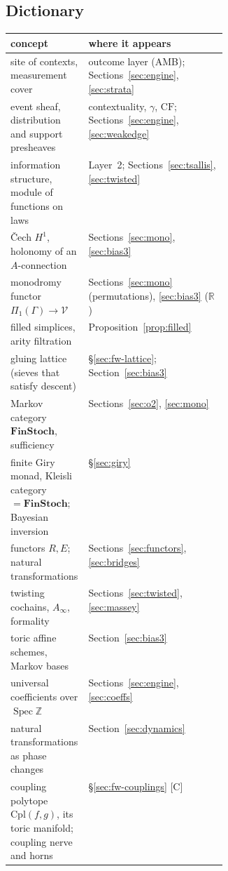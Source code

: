 \documentclass[11pt]{article}
\theoremstyle{definition}
\theoremstyle{remark}
\newcommand{\Z}{\mathbb{Z}}
\newcommand{\R}{\mathbb{R}}
\newcommand{\CF}{\mathrm{CF}}
\newcommand{\src}[1]{\textsf{\small[#1]}}
\begin{document}
\subsection{Dictionary}
\begin{center}\small
\begin{tabularx}{\linewidth}{@{}>{\raggedright}p{0.36\linewidth}>{\raggedright\arraybackslash}X@{}}
\toprule
concept & where it appears\\
\midrule
site of contexts, measurement cover & outcome layer (AMB); Sections~\ref{sec:engine}, \ref{sec:strata}\\
event sheaf, distribution and support presheaves & contextuality, $\gamma$, $\CF$; Sections~\ref{sec:engine}, \ref{sec:weakedge}\\
information structure, module of functions on laws & Layer~2; Sections~\ref{sec:tsallis}, \ref{sec:twisted}\\
\v{C}ech $H^1$, holonomy of an $A$-connection & Sections~\ref{sec:mono}, \ref{sec:bias3}\\
monodromy functor $\Pi_1(\Gamma)\to\mathcal V$ & Sections~\ref{sec:mono} (permutations), \ref{sec:bias3} ($\R$)\\
filled simplices, arity filtration & Proposition~\ref{prop:filled}\\
gluing lattice (sieves that satisfy descent) & \S\ref{sec:fw-lattice}; Section~\ref{sec:bias3}\\
Markov category $\mathbf{FinStoch}$, sufficiency & Sections~\ref{sec:o2}, \ref{sec:mono}\\
finite Giry monad, Kleisli category $=\mathbf{FinStoch}$; Bayesian inversion & \S\ref{sec:giry}\\
functors $R,E$; natural transformations & Sections~\ref{sec:functors}, \ref{sec:bridges}\\
twisting cochains, $A_\infty$, formality & Sections~\ref{sec:twisted}, \ref{sec:massey}\\
toric affine schemes, Markov bases & Section~\ref{sec:bias3}\\
universal coefficients over $\operatorname{Spec}\Z$ & Sections~\ref{sec:engine}, \ref{sec:coeffs}\\
natural transformations as phase changes & Section~\ref{sec:dynamics}\\
coupling polytope $\mathrm{Cpl}(f,g)$, its toric manifold; coupling nerve and horns & \S\ref{sec:fw-couplings} \src{C}\\
\bottomrule
\end{tabularx}
\end{center}
\end{document}
